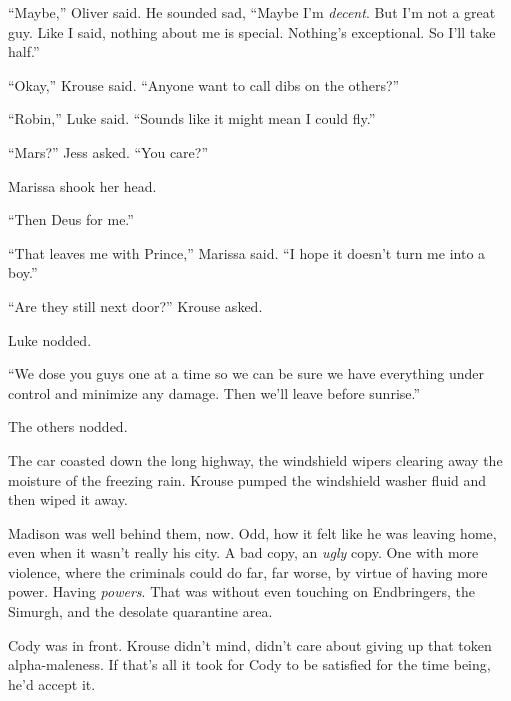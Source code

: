 ``Maybe,'' Oliver said.  He sounded sad, ``Maybe I'm \emph{decent}.  But I'm not a great guy.  Like I said, nothing about me is special.  Nothing's exceptional.  So I'll take half.''



``Okay,'' Krouse said.  ``Anyone want to call dibs on the others?''



``Robin,'' Luke said.  ``Sounds like it might mean I could fly.''



``Mars?'' Jess asked.  ``You care?''



Marissa shook her head.



``Then Deus for me.''



``That leaves me with Prince,'' Marissa said.  ``I hope it doesn't turn me into a boy.''



``Are they still next door?'' Krouse asked.



Luke nodded.



``We dose you guys one at a time so we can be sure we have everything under control and minimize any damage.  Then we'll leave before sunrise.''



The others nodded.



\blacksquare



The car coasted down the long highway, the windshield wipers clearing away the moisture of the freezing rain.  Krouse pumped the windshield washer fluid and then wiped it away.



Madison was well behind them, now.  Odd, how it felt like he was leaving home, even when it wasn't really his city.  A bad copy, an \emph{ugly }copy.  One with more violence, where the criminals could do far, far worse, by virtue of having more power.  Having \emph{powers}.  That was without even touching on Endbringers, the Simurgh, and the desolate quarantine area.



Cody was in front.  Krouse didn't mind, didn't care about giving up that token alpha-maleness.  If that's all it took for Cody to be satisfied for the time being, he'd accept it.



